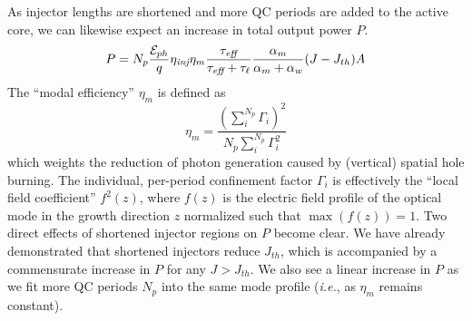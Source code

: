 As injector lengths are shortened and more QC periods are added to the active core, we can likewise expect an increase in total output power $P$.
\begin{equation}
P = N_p \frac{\EE_{ph}}{q} \eta_\textit{inj} \eta_m \frac{\tau_\textit{eff}}{\tau_\textit{eff}+\tau_{\ell}} \frac{\alpha_m}{\alpha_m + \alpha_w} (J-J_{th}) A
\end{equation}
The ``modal efficiency'' $\eta_m$ is defined as \cite{Gresch:PTL:2006}
\begin{equation}
\eta_m = \frac{\left(\sum_i^{N_p} \Gamma_i\right)^2}{N_p \sum_i^{N_p} \Gamma_i^2}
\end{equation}
which weights the reduction of photon generation caused by (vertical) spatial hole burning. The individual, per-period confinement factor $\Gamma_i$ is effectively the ``local field coefficient'' $f^2(z)$,  where $f(z)$ is the electric field profile of the optical mode in the growth direction $z$ normalized such that $\max(f(z))=1$. %
Two direct effects of shortened injector regions on $P$ become clear.  We have already demonstrated that shortened injectors reduce $J_{th}$, which is accompanied by a commensurate increase in $P$ for any $J > J_{th}$.  We also see a linear increase in $P$ as we fit more QC periods $N_p$ into the same mode profile (\emph{i.e.}, as $\eta_m$ remains constant).

